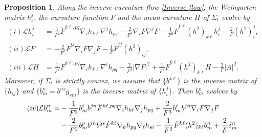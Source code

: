 \documentclass[11pt,reqno]{amsart}
\newtheorem{prop}[thm]{Proposition}
\theoremstyle{definition}
\theoremstyle{remark}
\numberwithin{equation}{section}
\renewcommand{\(}{\left(}
\renewcommand{\)}{\right)}
\renewcommand{\-}{\overline}
\begin{document}
\begin{prop}\label{Prop-evo-inverse}
	Along the inverse curvature flow \eqref{Inverse-flow}, the Weingarten matrix $h_i^j$, the curvature function $F$ and the mean curvature $H$ of $\Sigma_t$ evolve by
	\begin{align}
		(i)\mathcal{L}{h_i^j}&=\frac{1}{F^2}\ddot{F}^{k\ell,pq}\nabla_i{h_{k\ell}}\nabla^j{h_{pq}}-\frac{2}{F^3}\nabla_i{F}\nabla^j{F}+\frac{1}{F^2}\dot{F}^{k\ell}(h^2)_{k\ell}h_i^j-\frac{2}{F}(h^2)_i^j,\label{evo-hij}\\
		(ii)\mathcal{L}{F}&=-\frac{2}{F^3}\dot{F}^{ij}\nabla_i{F}\nabla_j{F}-\frac{1}{F}\dot{F}^{ij}(h^2)_{ij},\label{evo-F}\\
		(iii)\mathcal{L}{H}&=\frac{1}{F^2}\ddot{F}^{k\ell,pq}\nabla_i{h_{k\ell}}\nabla^i{h_{pq}}-\frac{2}{F^3}|\nabla F|^2+\frac{1}{F^2}\dot{F}^{k\ell}(h^2)_{k\ell}H-\frac{2}{F}|A|^2.\label{evo-H}
	\end{align}
Moreover, if $\Sigma_t$ is strictly convex, we assume that $\{b^{k\ell}\}$ is the inverse matrix of $\{h_{ij}\}$ and $\{b_m^n=b^{ns}g_{sm}\}$ is the inverse matrix of $\{h_i^j\}$. Then $b_m^n$ evolves by
\begin{align}
	(iv)\mathcal{L}{b_m^n}=&-\frac{1}{F^2}b_m^i b^{jn}\ddot{F}^{k\ell,pq}\nabla_i{h_{k\ell}}\nabla_j{h_{pq}}+\frac{2}{F^3}b_m^i b^{jn}\nabla_i F\nabla_j F\notag\\
	&-\frac{2}{F^2}b_m^pb^{in}b^{qs}\dot{F}^{k\ell}\nabla_k{h_{pq}}\nabla_{\ell}{h_{si}}-\frac{1}{F^2}\dot{F}^{k\ell}(h^2)_{k\ell}b_m^n+\frac{2}{F}\delta_m^n.\label{evo-b}
\end{align}
\end{prop}
\end{document}

